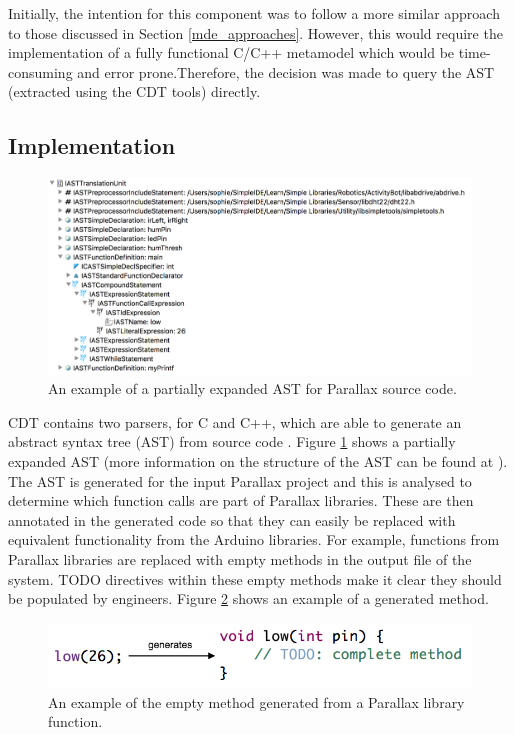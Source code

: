 \documentclass{UoYCSproject}
\begin{document}
Initially, the intention for this component was to follow a more similar approach to those discussed in Section \ref{mde_approaches}. However, this would require the implementation of a fully functional C/C++ metamodel which would be time-consuming and error prone.Therefore, the decision was made to query the AST (extracted using the CDT tools) directly.

\subsection{Implementation} \label{parallax_impl}
\begin{figure}[h!]
  \centering
  \includegraphics[width=0.8\linewidth]{graphics/ast_diagram.png}
  \caption{An example of a partially expanded AST for Parallax source code.}
  \label{fig:ast_diagram}
\end{figure}

CDT contains two parsers, for C and C++, which are able to generate an abstract syntax tree (AST) from source code \parencite{cdt_parsing}. Figure \ref{fig:ast_diagram} shows a partially expanded AST (more information on the structure of the AST can be found at \parencite{ast_structure}). The AST is generated for the input Parallax project and this is analysed to determine which function calls are part of Parallax libraries. These are then annotated in the generated code so that they can easily be replaced with equivalent functionality from the Arduino libraries. For example, functions from Parallax libraries are replaced with empty methods in the output file of the system. TODO directives within these empty methods make it clear they should be populated by engineers. Figure \ref{fig:gen_stub} shows an example of a generated method.

\begin{figure}[h!]
  \centering
  \includegraphics[width=0.8\linewidth]{graphics/generated_method_stub.png}
  \caption{An example of the empty method generated from a Parallax library function.}
  \label{fig:gen_stub}
\end{figure}
\end{document}
